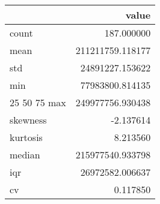 \begin{tabular}{lr}
\toprule
 & value \\
\midrule
count & 187.000000 \\
mean & 211211759.118177 \\
std & 24891227.153622 \\
min & 77983800.814135 \\
25%
50%
75%
max & 249977756.930438 \\
skewness & -2.137614 \\
kurtosis & 8.213560 \\
median & 215977540.933798 \\
iqr & 26972582.006637 \\
cv & 0.117850 \\
\bottomrule
\end{tabular}
